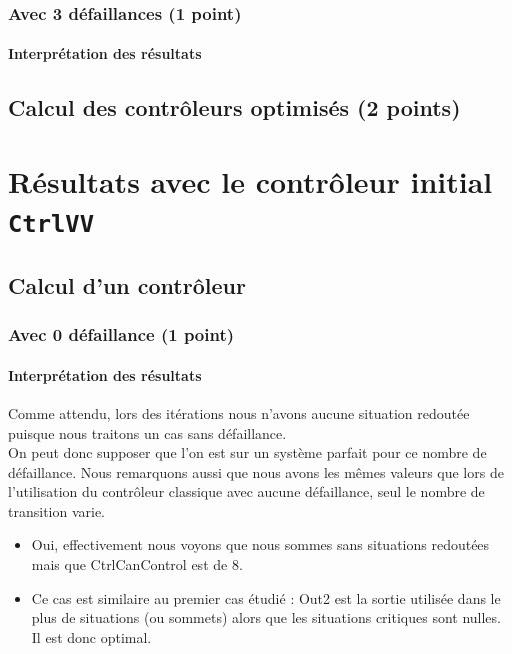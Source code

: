 \documentclass[a4paper]{book}
\begin{document}
\subsubsection{Avec 3 défaillances (1 point)}





\paragraph{Interprétation des résultats}



\subsection{Calcul des contrôleurs optimisés (2 points)}

\section{Résultats avec le contrôleur initial {\tt CtrlVV}}

\subsection{Calcul d'un contrôleur}

\subsubsection{Avec 0 défaillance (1 point)}





\paragraph{Interprétation des résultats}

Comme attendu, lors des itérations nous n'avons aucune situation redoutée puisque nous traitons un cas sans défaillance. \\ 
On peut donc supposer que l'on est sur un système parfait pour ce nombre de défaillance. Nous remarquons aussi que nous avons les mêmes valeurs que lors de l'utilisation du contrôleur classique avec aucune défaillance, seul le nombre de transition varie.

\begin{itemize}
	\item Oui, effectivement nous voyons que nous sommes sans situations redoutées mais que CtrlCanControl est de 8.
	
	\item Ce cas est similaire au premier cas étudié : Out2 est la sortie utilisée dans le plus de situations (ou sommets) alors que les situations critiques sont nulles. Il est donc optimal.
 
\end{itemize}
\end{document}

